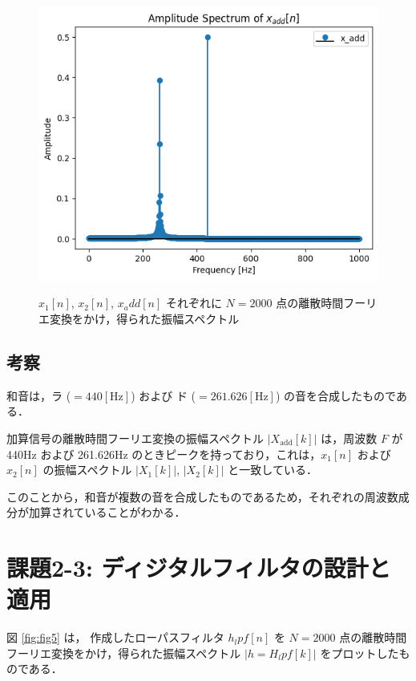 \documentclass[fleqn, a4paper. 12pt]{jsarticle}
\begin{document}
\begin{figure}[h]
\begin{center}
    \begin{minipage}[t]{0.48\columnwidth}
      \includegraphics[width=\columnwidth]{fig_22.png}
      \label{fig:fig2}
    \end{minipage}
    \end{center}
    \caption{$x_1[n]$, $x_2[n]$, $x_add[n]$ それぞれに $N = 2000$ 点の離散時間フーリエ変換をかけ，得られた振幅スペクトル}
  \end{figure}

  \subsection*{考察}

    和音は，ラ ($ = 440 [\mathrm{Hz}]$) および ド ($ = 261.626 [\mathrm{Hz}]$) の音を合成したものである．

    加算信号の離散時間フーリエ変換の振幅スペクトル $|X_{\text{add}}[k]|$ は，周波数 $F$ が 440Hz および 261.626Hz のときピークを持っており，これは，$x_1[n]$ および $x_2[n]$ の振幅スペクトル $|X_1[k]|$, $|X_2[k]|$ と一致している．

    このことから，和音が複数の音を合成したものであるため，それぞれの周波数成分が加算されていることがわかる．

  \newpage
  \section*{課題2-3: ディジタルフィルタの設計と適用}

  図 \ref{fig:fig5} は， 作成したローパスフィルタ $h_lpf[n]$ を $N = 2000$ 点の離散時間フーリエ変換をかけ，得られた振幅スペクトル $|h=H_lpf[k]|$ をプロットしたものである．
\end{document}
